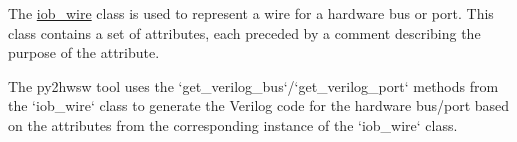 %

%
%

The \href{https://github.com/IObundle/py2hwsw/blob/main/py2hwsw/scripts/iob_wire.py}{iob\_wire} class is used to represent a wire for a hardware bus or port.
This class contains a set of attributes, each preceded by a comment describing the purpose of the attribute.


%
%

The py2hwsw tool uses the `get\_verilog\_bus`/`get\_verilog\_port` methods from the `iob\_wire` class to generate the Verilog code for the hardware bus/port based on the attributes from the corresponding instance of the `iob\_wire` class.

